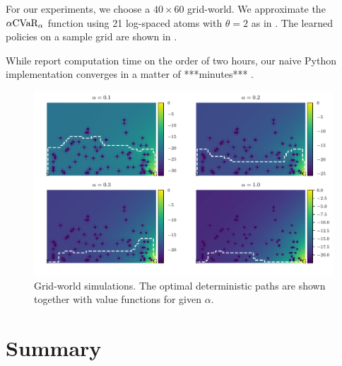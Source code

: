 For our experiments, we choose a $40 \times 60$ grid-world. We approximate the $\alpha\text{CVaR}_\alpha$ function using 21 log-spaced atoms with $\theta=2$ as in \citep{chow2015risk}. The learned policies on a sample grid are shown in .

While \citet{chow2015risk} report computation time on the order of two hours, our naive Python implementation converges in a matter of ***minutes*** .

\begin{figure}[h]
\center
\includegraphics[width=\linewidth]{gfx/vi_optimal_paths.pdf}
\caption{Grid-world simulations. The optimal deterministic paths are shown together with value functions for given $\alpha$.}
\label{fig:vigrid}
\end{figure}

\section{Summary}





